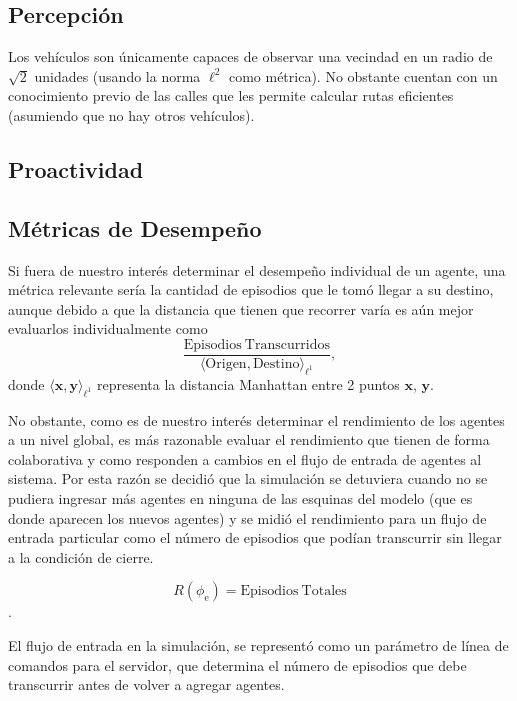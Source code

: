 \documentclass[twoside,11pt]{article}
\begin{document}
\subsection{Percepción}
Los vehículos son únicamente capaces de observar una vecindad en un radio de $\sqrt{2}$
unidades (usando la norma $\ell^{2}$ como métrica). No obstante cuentan con un conocimiento
previo de las calles que les permite calcular rutas eficientes (asumiendo que no hay otros
vehículos).

\subsection{Proactividad}

\subsection{Métricas de Desempeño}
Si fuera de nuestro interés determinar el desempeño individual de un agente, una métrica relevante sería 
la cantidad de episodios que le tomó llegar a su destino, aunque debido a que la distancia que tienen que 
recorrer varía es aún mejor evaluarlos individualmente como
$$\frac{\mathrm{Episodios \ Transcurridos}}{\langle\mathrm{Origen}, \mathrm{Destino}\rangle_{\ell^{1}}},$$
donde $\langle \bm{x}, \bm{y}\rangle_{\ell^{1}}$ representa la distancia Manhattan entre 2
puntos $\bm{x}$, $\bm{y}$.

No obstante, como es de nuestro interés determinar el rendimiento de los agentes a un nivel global, es más
razonable evaluar el rendimiento que tienen de forma colaborativa y como responden a cambios en el flujo de
entrada de agentes al sistema. Por esta razón se decidió que la simulación se detuviera cuando no se pudiera
ingresar más agentes en ninguna de las esquinas del modelo (que es donde aparecen los nuevos agentes) y se 
midió el rendimiento para un flujo de entrada particular como el número de episodios que podían transcurrir sin
llegar a la condición de cierre.

$$R(\phi_{\mathrm{e}}) = \mathrm{Episodios \ Totales}$$.

El flujo de entrada en la simulación, se representó como un parámetro de línea de comandos para el servidor, que 
determina el número de episodios que debe transcurrir antes de volver a agregar agentes.
\end{document}

